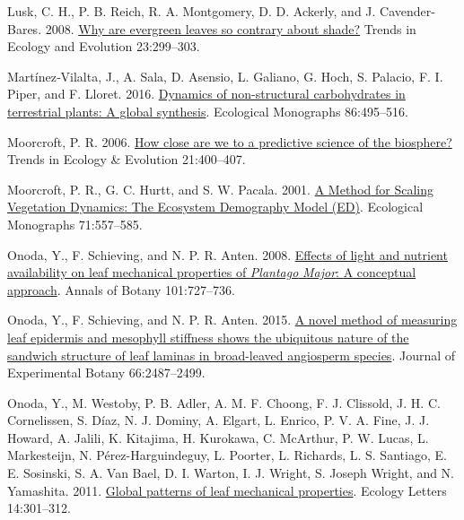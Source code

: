\documentclass[
  12pt,
  letterpaper,
  DIV=11,
  numbers=noendperiod]{scrartcl}
\newlength{\cslhangindent}
\newlength{\cslentryspacingunit} %
\newenvironment{CSLReferences}[2] %
 {%
  \setlength{\parindent}{0pt}
  \ifodd #1
  \let\oldpar\par
  \def\par{\hangindent=\cslhangindent\oldpar}
  \fi
  \setlength{\parskip}{#2\cslentryspacingunit}
 }%
 {}
\begin{document}
\begin{CSLReferences}{1}{0}
\leavevmode{}%
Lusk, C. H., P. B. Reich, R. A. Montgomery, D. D. Ackerly, and J.
Cavender-Bares. 2008.
\href{https://doi.org/10.1016/j.tree.2008.02.006}{Why are evergreen
leaves so contrary about shade?} Trends in Ecology and Evolution
23:299--303.

\leavevmode{}%
Martínez‐Vilalta, J., A. Sala, D. Asensio, L. Galiano, G. Hoch, S.
Palacio, F. I. Piper, and F. Lloret. 2016.
\href{https://doi.org/10.1002/ecm.1231}{Dynamics of non-structural
carbohydrates in terrestrial plants: A global synthesis}. Ecological
Monographs 86:495--516.

\leavevmode{}%
Moorcroft, P. R. 2006.
\href{https://doi.org/10.1016/j.tree.2006.04.009}{How close are we to a
predictive science of the biosphere?} Trends in Ecology \& Evolution
21:400--407.

\leavevmode{}%
Moorcroft, P. R., G. C. Hurtt, and S. W. Pacala. 2001.
\href{https://doi.org/10.2307/3100036}{A {Method} for {Scaling
Vegetation Dynamics}: {The Ecosystem Demography Model} ({ED})}.
Ecological Monographs 71:557--585.

\leavevmode{}%
Onoda, Y., F. Schieving, and N. P. R. Anten. 2008.
\href{https://doi.org/10.1093/aob/mcn013}{Effects of light and nutrient
availability on leaf mechanical properties of {\emph{Plantago}}{
\emph{Major}}: {A} conceptual approach}. Annals of Botany 101:727--736.

\leavevmode{}%
Onoda, Y., F. Schieving, and N. P. R. Anten. 2015.
\href{https://doi.org/10.1093/jxb/erv024}{A novel method of measuring
leaf epidermis and mesophyll stiffness shows the ubiquitous nature of
the sandwich structure of leaf laminas in broad-leaved angiosperm
species}. Journal of Experimental Botany 66:2487--2499.

\leavevmode{}%
Onoda, Y., M. Westoby, P. B. Adler, A. M. F. Choong, F. J. Clissold, J.
H. C. Cornelissen, S. Díaz, N. J. Dominy, A. Elgart, L. Enrico, P. V. A.
Fine, J. J. Howard, A. Jalili, K. Kitajima, H. Kurokawa, C. McArthur, P.
W. Lucas, L. Markesteijn, N. Pérez-Harguindeguy, L. Poorter, L.
Richards, L. S. Santiago, E. E. Sosinski, S. A. Van Bael, D. I. Warton,
I. J. Wright, S. Joseph Wright, and N. Yamashita. 2011.
\href{https://doi.org/10.1111/j.1461-0248.2010.01582.x}{Global patterns
of leaf mechanical properties}. Ecology Letters 14:301--312.


\end{CSLReferences}
\end{document}
